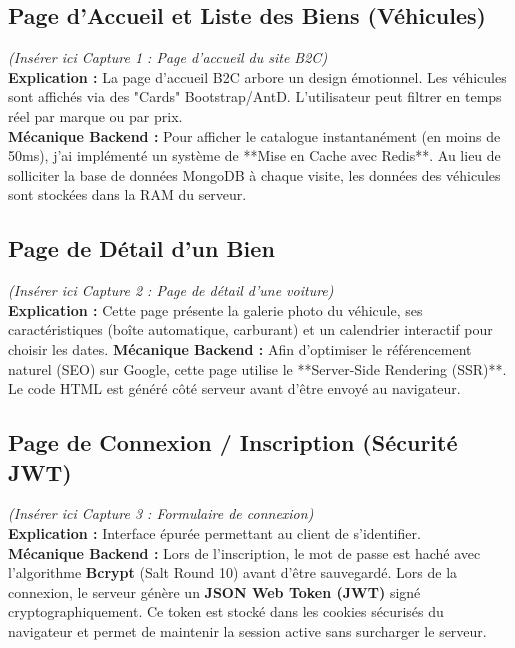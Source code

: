 \documentclass[12pt, a4paper]{report}
\begin{document}
\subsection{Page d'Accueil et Liste des Biens (Véhicules)}
\textit{(Insérer ici Capture 1 : Page d'accueil du site B2C)} \\
\textbf{Explication :} La page d'accueil B2C arbore un design émotionnel. Les véhicules sont affichés via des "Cards" Bootstrap/AntD. L'utilisateur peut filtrer en temps réel par marque ou par prix. \\
\textbf{Mécanique Backend :} Pour afficher le catalogue instantanément (en moins de 50ms), j'ai implémenté un système de **Mise en Cache avec Redis**. Au lieu de solliciter la base de données MongoDB à chaque visite, les données des véhicules sont stockées dans la RAM du serveur.

\subsection{Page de Détail d'un Bien}
\textit{(Insérer ici Capture 2 : Page de détail d'une voiture)} \\
\textbf{Explication :} Cette page présente la galerie photo du véhicule, ses caractéristiques (boîte automatique, carburant) et un calendrier interactif pour choisir les dates.
\textbf{Mécanique Backend :} Afin d'optimiser le référencement naturel (SEO) sur Google, cette page utilise le **Server-Side Rendering (SSR)**. Le code HTML est généré côté serveur avant d'être envoyé au navigateur.

\subsection{Page de Connexion / Inscription (Sécurité JWT)}
\textit{(Insérer ici Capture 3 : Formulaire de connexion)} \\
\textbf{Explication :} Interface épurée permettant au client de s'identifier. \\
\textbf{Mécanique Backend :} Lors de l'inscription, le mot de passe est haché avec l'algorithme \textbf{Bcrypt} (Salt Round 10) avant d'être sauvegardé. Lors de la connexion, le serveur génère un \textbf{JSON Web Token (JWT)} signé cryptographiquement. Ce token est stocké dans les cookies sécurisés du navigateur et permet de maintenir la session active sans surcharger le serveur.
\end{document}
